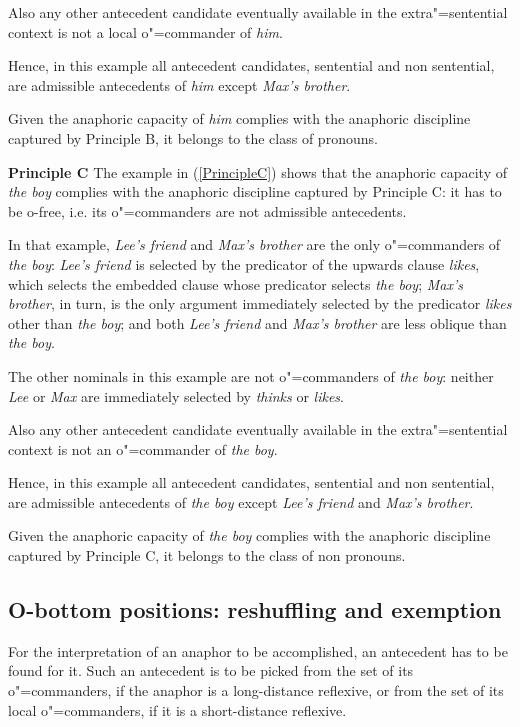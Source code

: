 \documentclass[output=paper
	        ,collection
	        ,collectionchapter
 	        ,biblatex
                ,babelshorthands
                ,newtxmath
                ,draftmode
                ,colorlinks, citecolor=brown
]{langscibook}
\begin{document}
Also any other antecedent candidate eventually available in the extra"=sentential context is not
a local o"=commander of {\em him}.

Hence, in this example all antecedent candidates, sentential and non sentential, are admissible 
antecedents of {\em him} except {\em Max's brother}.

Given the anaphoric capacity of {\em him} complies with  the anaphoric discipline captured 
by Principle B, it belongs to the class of pronouns.


{\bf Principle C} The example in (\ref{PrincipleC}) shows that the anaphoric capacity of {\em the boy} complies with 
the anaphoric discipline captured by Principle C: it has to be o-free, i.e. its o"=commanders are not admissible antecedents. 

In that example, {\em Lee's friend} and {\em Max's brother} are the only o"=commanders of {\em the boy}: 
{\em Lee's friend} is selected by the predicator of the upwards
clause {\em likes}, which selects the embedded clause whose predicator selects
{\em the boy}; {\em Max's brother}, in turn, is the only argument immediately selected by 
the predicator {\em likes} other than {\em the boy};
and both {\em Lee's friend} and {\em Max's brother} are less oblique than {\em the boy}.

The other nominals in this example are not o"=commanders of {\em the boy}: neither {\em Lee} or {\em Max} 
are immediately selected by {\em thinks} or {\em likes}.

Also any other antecedent candidate eventually available in the extra"=sentential context is not
an o"=commander of {\em the boy}.

Hence, in this example all antecedent candidates, sentential and non sentential, are admissible antecedents of {\em the boy} except {\em Lee's friend} and {\em Max's brother}.

Given the anaphoric capacity of {\em the boy} complies with  the anaphoric discipline captured 
by Principle C, it belongs to the class of non pronouns.






\subsection{O-bottom positions: reshuffling and exemption}\label{Exemption}

For the interpretation of an anaphor to be accomplished,
an antecedent has to be found for it. Such an antecedent is to be picked from
the set of its o"=commanders, if the anaphor is a long-distance reflexive, 
or from the set of its local o"=commanders, if it is a short-distance reflexive.
\end{document}
